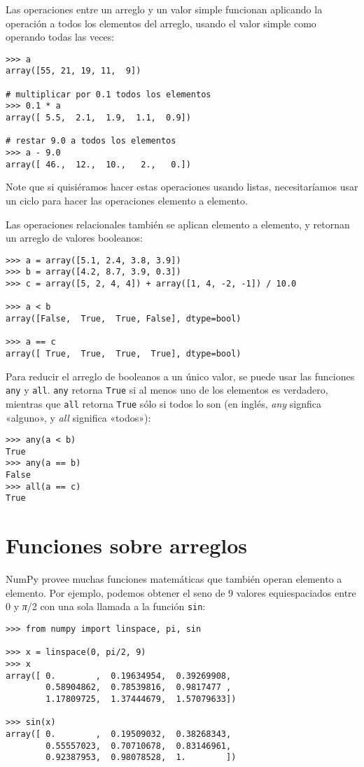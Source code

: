 Las operaciones entre un arreglo y un valor simple funcionan aplicando
la operación a todos los elementos del arreglo, usando el valor simple
como operando todas las veces:

\begin{lstlisting}
>>> a
array([55, 21, 19, 11,  9])

# multiplicar por 0.1 todos los elementos
>>> 0.1 * a
array([ 5.5,  2.1,  1.9,  1.1,  0.9])

# restar 9.0 a todos los elementos
>>> a - 9.0
array([ 46.,  12.,  10.,   2.,   0.])
\end{lstlisting}

Note que si quisiéramos hacer estas operaciones usando listas,
necesitaríamos usar un ciclo para hacer las operaciones elemento a
elemento.

Las operaciones relacionales también se aplican elemento a elemento, y
retornan un arreglo de valores booleanos:

\begin{lstlisting}
>>> a = array([5.1, 2.4, 3.8, 3.9])
>>> b = array([4.2, 8.7, 3.9, 0.3])
>>> c = array([5, 2, 4, 4]) + array([1, 4, -2, -1]) / 10.0

>>> a < b
array([False,  True,  True, False], dtype=bool)

>>> a == c
array([ True,  True,  True,  True], dtype=bool)
\end{lstlisting}

Para reducir el arreglo de booleanos a un único valor, se puede usar las
funciones \lstinline!any! y \lstinline!all!. \lstinline!any! retorna
\lstinline!True! si al menos uno de los elementos es verdadero, mientras
que \lstinline!all! retorna \lstinline!True! sólo si todos lo son (en
inglés, \emph{any} signfica «alguno», y \emph{all} significa «todos»):

\begin{lstlisting}
>>> any(a < b)
True
>>> any(a == b)
False
>>> all(a == c)
True
\end{lstlisting}

\section{Funciones sobre arreglos}

NumPy provee muchas funciones matemáticas que también operan elemento a
elemento. Por ejemplo, podemos obtener el seno de 9 valores
equiespaciados entre 0 y \emph{π}/2 con una sola llamada a la función
\lstinline!sin!:

\begin{lstlisting}
>>> from numpy import linspace, pi, sin

>>> x = linspace(0, pi/2, 9)
>>> x
array([ 0.        ,  0.19634954,  0.39269908,
        0.58904862,  0.78539816,  0.9817477 ,
        1.17809725,  1.37444679,  1.57079633])

>>> sin(x)
array([ 0.        ,  0.19509032,  0.38268343,
        0.55557023,  0.70710678,  0.83146961,
        0.92387953,  0.98078528,  1.        ])
\end{lstlisting}

